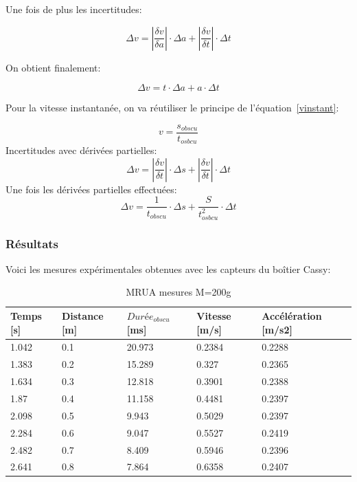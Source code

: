 Une fois de plus les incertitudes:

\begin{equation}
    \Delta v = |\frac{\delta v}{\delta a}|\cdot \Delta a + |\frac{\delta v}{\delta t}|\cdot \Delta t
\end{equation}

On obtient finalement:

\begin{equation}
    \Delta v = t \cdot \Delta a + a \cdot \Delta t
\end{equation}

Pour la vitesse instantanée, on va réutiliser le principe de l'équation~\eqref{vinstant}:

\begin{equation}
    v= \frac{s_{obscu}}{t_{osbcu}}
\end{equation}
Incertitudes avec dérivées partielles:
\begin{equation}
    \Delta v = |\frac{\delta v}{\delta t}|\cdot \Delta s + |\frac{\delta v}{\delta t}|\cdot \Delta t
\end{equation}
Une fois les dérivées partielles effectuées:
\begin{equation}
    \Delta v = \frac{1}{t_{obscu}}\cdot \Delta s + \frac{S}{t_{osbcu}^2}\cdot \Delta t
\end{equation}


\newpage
\subsubsection{Résultats}

Voici les mesures expérimentales obtenues avec les capteurs du boîtier Cassy:

\begin{table}[ht]
    \centering
    \caption[MRUA mesures M=200g]{MRUA mesures M=200g}
    \begin{tabular}{|l|l|l|l|l|}
	\hline
	Temps [s]	&Distance [m]	&$Durée_{obscu}$ [ms]	&Vitesse [m/s]	&Accélération [m/s2]\\
	\hline
	1.042	&0.1	&20.973	&0.2384	&0.2288 \\
	1.383	&0.2	&15.289	&0.327	&0.2365 \\
	1.634	&0.3	&12.818	&0.3901	&0.2388 \\
	1.87	&0.4	&11.158	&0.4481	&0.2397 \\
	2.098	&0.5	&9.943	&0.5029	&0.2397 \\
	2.284	&0.6	&9.047	&0.5527	&0.2419 \\
	2.482	&0.7	&8.409	&0.5946	&0.2396 \\
	2.641	&0.8	&7.864	&0.6358	&0.2407 \\
	\hline
    \end{tabular}
\end{table}

